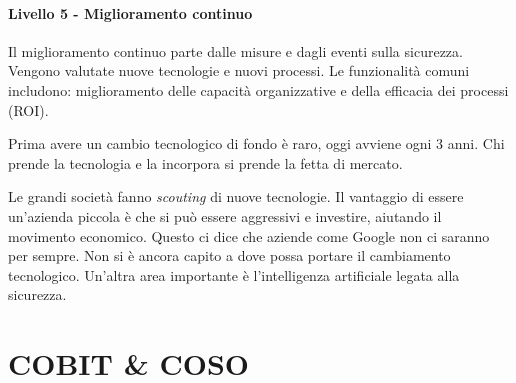 \paragraph{Livello 5 - Miglioramento continuo}

Il miglioramento continuo parte dalle misure e dagli eventi sulla sicurezza.
Vengono valutate nuove tecnologie e nuovi processi. Le funzionalità comuni
includono: miglioramento delle capacità organizzative e della efficacia dei
processi (ROI).

Prima avere un cambio tecnologico di fondo è raro, oggi avviene ogni 3 anni. Chi
prende la tecnologia e la incorpora si prende la fetta di mercato.

Le grandi società fanno \textit{scouting} di nuove tecnologie. Il vantaggio di
essere un'azienda piccola è che si può essere aggressivi e investire, aiutando
il movimento economico. Questo ci dice che aziende come Google non ci
saranno per sempre. Non si è ancora capito a dove possa portare il cambiamento
tecnologico. Un'altra area importante è l'intelligenza artificiale legata
alla sicurezza.


\section{COBIT \& COSO}

